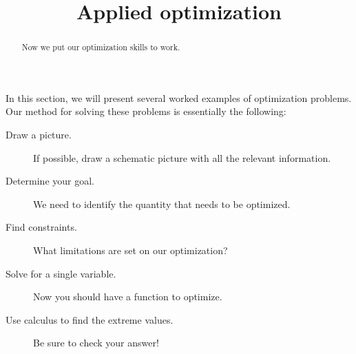 \documentclass{ximera}
\title[Dig-In:]{Applied optimization}
\begin{document}
\begin{abstract}
  Now we put our optimization skills to work.
\end{abstract}
\maketitle


In this section, we will present several worked examples of
optimization problems. Our method for solving these problems is
essentially the following:
\begin{description}
\item[Draw a picture.] If possible, draw a schematic picture with all the relevant information. 
\item[Determine your goal.] We need to identify the quantity that needs to be
  optimized.
\item[Find constraints.] What limitations are set on our
  optimization?
\item[Solve for a single variable.] Now you should have a function to optimize.
\item[Use calculus to find the extreme values.] Be sure to check your answer!
\end{description}
\end{document}
